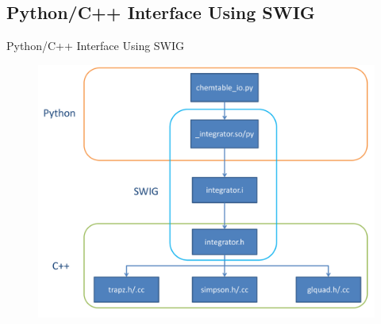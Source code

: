 \documentclass{beamer}
\begin{document}
\subsection{Python/C++ Interface Using SWIG}
\begin{frame}{Python/C++ Interface Using SWIG}

\begin{figure}
\includegraphics[width=\textwidth]{python_swig_c++.pdf}
\end{figure}


\end{frame}


\end{document}
